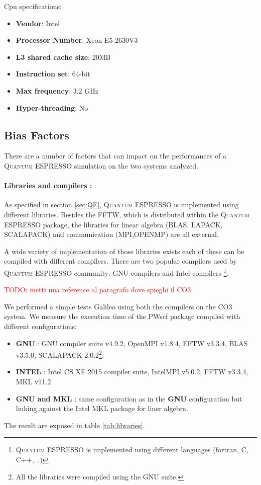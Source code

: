 \documentclass[a4paper,12pt]{article}
\newcommand\mynotes[1]{\begin{flushright}

\textcolor{red}{TODO: #1}\end{flushright}}
\newcommand\QE{\textsc{Quantum} ESPRESSO }
\newcommand\CO{CO3 }
\begin{document}
Cpu specifications:
\begin{itemize}
\item \textbf{Vendor}: Intel
\item \textbf{Processor Number}: Xeon E5-2630V3
\item \textbf{L3 shared cache size}: 20MB
\item \textbf{Instruction set}: 64-bit
\item \textbf{Max frequency}: 3.2 GHz
\item \textbf{Hyper-threading}: No 
\end{itemize}



\subsection{Bias Factors}

There are a number of factors that can impact on the performances of a \QE simulation on the two systems analyzed.

\paragraph{Libraries and compilers : }
As specified in section \ref{sec:QE}, \QE is implemented using different libraries. 
Besides the FFTW, which is distributed within the \QE package, the libraries for linear algebra (BLAS, LAPACK, SCALAPACK) and communication (MPI,OPENMP) are all external.

A wide variety of implementation of those libraries exists each of these can be compiled with different compilers.
There are two popular compilers used by \QE community: GNU compilers and Intel compilers \footnote{\QE is implemented using different languages (fortran, C, C++,...) }.


\mynotes{metti una reference al paragrafo dove spieghi il \CO}
We performed a simple tests Galileo using both the compilers on the \CO system. 
We measure the execution time of the PWscf package compiled with different configurations: 
\begin{itemize}
	\item \textbf{GNU} : GNU compiler suite v4.9.2, OpenMPI v1.8.4, FFTW v3.3.4, BLAS v3.5.0, SCALAPACK 2.0.2\footnote{ All the libraries were compiled using the GNU suite.}.
	\item \textbf{INTEL} : Intel CS XE 2015 compiler suite, IntelMPI v5.0.2,  FFTW v3.3.4, MKL v11.2
	\item \textbf{GNU and MKL}  : same configuration as in the \textbf{GNU} configuration but linking against the Intel MKL package for liner algebra.
\end{itemize}
The result are exposed in table \ref{tab:libraries}.
\end{document}
